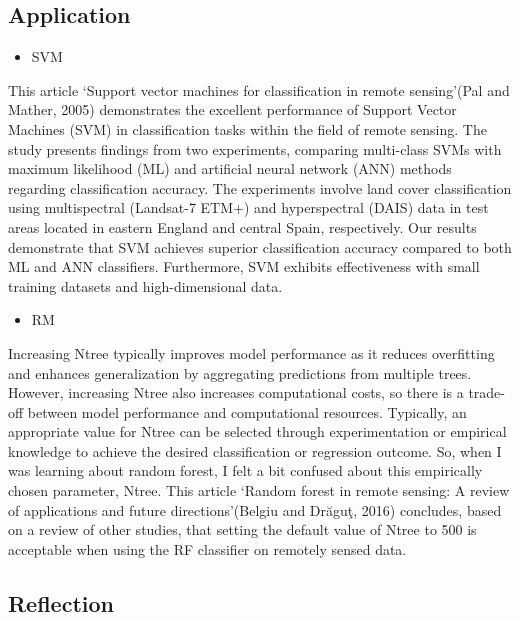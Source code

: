 \documentclass[
  letterpaper,
  DIV=11,
  numbers=noendperiod]{scrreprt}
\providecommand{\tightlist}{%
  \setlength{\itemsep}{0pt}\setlength{\parskip}{0pt}}\usepackage{longtable,booktabs,array}
\begin{document}
\hypertarget{application-3}{%
\subsection{Application}\label{application-3}}

\begin{itemize}
\tightlist
\item
  SVM
\end{itemize}

This article `Support vector machines for classification in remote
sensing'(Pal and Mather, 2005) demonstrates the excellent performance of
Support Vector Machines (SVM) in classification tasks within the field
of remote sensing. The study presents findings from two experiments,
comparing multi-class SVMs with maximum likelihood (ML) and artificial
neural network (ANN) methods regarding classification accuracy. The
experiments involve land cover classification using multispectral
(Landsat-7 ETM+) and hyperspectral (DAIS) data in test areas located in
eastern England and central Spain, respectively. Our results demonstrate
that SVM achieves superior classification accuracy compared to both ML
and ANN classifiers. Furthermore, SVM exhibits effectiveness with small
training datasets and high-dimensional data.

\begin{itemize}
\tightlist
\item
  RM
\end{itemize}

Increasing Ntree typically improves model performance as it reduces
overfitting and enhances generalization by aggregating predictions from
multiple trees. However, increasing Ntree also increases computational
costs, so there is a trade-off between model performance and
computational resources. Typically, an appropriate value for Ntree can
be selected through experimentation or empirical knowledge to achieve
the desired classification or regression outcome. So, when I was
learning about random forest, I felt a bit confused about this
empirically chosen parameter, Ntree. This article `Random forest in
remote sensing: A review of applications and future directions'(Belgiu
and Drăguţ, 2016) concludes, based on a review of other studies, that
setting the default value of Ntree to 500 is acceptable when using the
RF classifier on remotely sensed data.

\hypertarget{reflection-3}{%
\subsection{Reflection}\label{reflection-3}}
\end{document}
